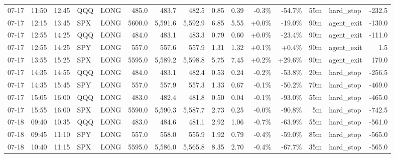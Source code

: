 \documentclass[11pt,a4paper,twoside]{article}
\begin{document}
\begin{landscape}
\begin{center}
\begin{longtable}{>{\color{txtmain}}l l l l l r r r r r r r r >{\color{txtmain}}l r}
07-17 & 11:50 & 12:45 & QQQ & LONG & 485.0 & 483.7 & 482.5 & 0.85 & 0.39 & \textcolor{lossred}{-0.3\%} & \textcolor{lossred}{-54.7\%} & 55m & hard\_stop & \textcolor{lossred}{-232.5} \\
07-17 & 12:15 & 13:45 & SPX & LONG & 5600.0 & 5,591.6 & 5,592.9 & 6.85 & 5.55 & \textcolor{wingreen}{+0.0\%} & \textcolor{lossred}{-19.0\%} & 90m & agent\_exit & \textcolor{lossred}{-130.0} \\
07-17 & 12:55 & 14:25 & QQQ & LONG & 484.0 & 483.1 & 483.3 & 0.79 & 0.60 & \textcolor{wingreen}{+0.0\%} & \textcolor{lossred}{-23.4\%} & 90m & agent\_exit & \textcolor{lossred}{-111.0} \\
07-17 & 12:55 & 14:25 & SPY & LONG & 557.0 & 557.6 & 557.9 & 1.31 & 1.32 & \textcolor{wingreen}{+0.1\%} & \textcolor{wingreen}{+0.4\%} & 90m & agent\_exit & \textcolor{wingreen}{1.5} \\
07-17 & 13:55 & 15:25 & SPX & LONG & 5595.0 & 5,589.2 & 5,598.8 & 5.75 & 7.45 & \textcolor{wingreen}{+0.2\%} & \textcolor{wingreen}{+29.6\%} & 90m & agent\_exit & \textcolor{wingreen}{170.0} \\
07-17 & 14:35 & 14:55 & QQQ & LONG & 484.0 & 483.1 & 482.4 & 0.53 & 0.24 & \textcolor{lossred}{-0.2\%} & \textcolor{lossred}{-53.8\%} & 20m & hard\_stop & \textcolor{lossred}{-256.5} \\
07-17 & 14:35 & 15:45 & SPY & LONG & 557.0 & 557.9 & 557.3 & 1.33 & 0.67 & \textcolor{lossred}{-0.1\%} & \textcolor{lossred}{-50.2\%} & 70m & hard\_stop & \textcolor{lossred}{-469.0} \\
07-17 & 15:05 & 16:00 & QQQ & LONG & 483.0 & 482.4 & 481.8 & 0.50 & 0.04 & \textcolor{lossred}{-0.1\%} & \textcolor{lossred}{-93.0\%} & 55m & hard\_stop & \textcolor{lossred}{-465.0} \\
07-17 & 15:55 & 16:00 & SPX & LONG & 5590.0 & 5,590.3 & 5,587.7 & 2.73 & 0.25 & \textcolor{lossred}{-0.0\%} & \textcolor{lossred}{-90.8\%} & 5m & hard\_stop & \textcolor{lossred}{-742.5} \\
07-18 & 09:40 & 10:35 & QQQ & LONG & 483.0 & 484.6 & 481.1 & 2.92 & 1.06 & \textcolor{lossred}{-0.7\%} & \textcolor{lossred}{-63.9\%} & 55m & hard\_stop & \textcolor{lossred}{-561.0} \\
07-18 & 09:45 & 11:10 & SPY & LONG & 557.0 & 558.0 & 555.9 & 1.92 & 0.79 & \textcolor{lossred}{-0.4\%} & \textcolor{lossred}{-59.0\%} & 85m & hard\_stop & \textcolor{lossred}{-565.0} \\
07-18 & 10:40 & 11:15 & SPX & LONG & 5595.0 & 5,586.0 & 5,565.8 & 8.35 & 2.70 & \textcolor{lossred}{-0.4\%} & \textcolor{lossred}{-67.7\%} & 35m & hard\_stop & \textcolor{lossred}{-565.0} \\

\end{longtable}
\end{center}
\end{landscape}
\end{document}
